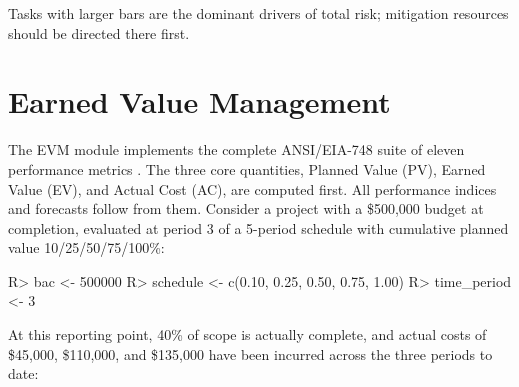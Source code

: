 \documentclass[
]{jss}
\begin{document}
Tasks with larger bars are the dominant drivers of total risk;
mitigation resources should be directed there first.

\section{Earned Value Management}\label{sec-evm}

The EVM module implements the complete ANSI/EIA-748 suite of eleven
performance metrics \citep{Fleming2010}. The three core quantities,
Planned Value (PV), Earned Value (EV), and Actual Cost (AC), are
computed first. All performance indices and forecasts follow from them.
Consider a project with a \$500,000 budget at completion, evaluated at
period 3 of a 5-period schedule with cumulative planned value
10/25/50/75/100\%:

\begin{CodeChunk}
\begin{CodeInput}
R> bac         <- 500000
R> schedule    <- c(0.10, 0.25, 0.50, 0.75, 1.00)
R> time_period <- 3
\end{CodeInput}
\end{CodeChunk}

At this reporting point, 40\% of scope is actually complete, and actual
costs of \$45,000, \$110,000, and \$135,000 have been incurred across
the three periods to date:

\begin{CodeChunk}
\end{CodeChunk}
\end{document}
